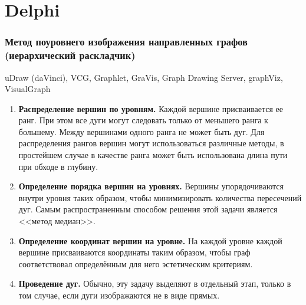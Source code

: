 \documentclass{beamer}
\begin{document}

\section{Delphi}
\begin{frame}
\frametitle{Метод поуровнего изображения направленных графов (иерархический раскладчик)}
\scriptsize{

uDraw (daVinci), VCG, Graphlet, GraVis, Graph Drawing Server, graphViz, VisualGraph

\begin{enumerate}
	\item \textbf{Распределение вершин по уровням.} Каждой вершине присваивается ее ранг. При этом все дуги могут следовать только от меньшего ранга к большему. Между вершинами одного ранга не может быть дуг. Для распределения рангов вершин могут использоваться различные методы, в простейшем случае в качестве ранга может быть использована длина пути при обходе в глубину.
	\item \textbf{Определение порядка вершин на уровнях.} Вершины упорядочиваются внутри уровня таких образом, чтобы минимизировать количества пересечений дуг. Самым распространенным способом решения этой задачи является <<метод медиан>>.
	\item \textbf{Определение координат вершин на уровне.} На каждой уровне каждой вершине присваиваются координаты таким образом, чтобы граф соответствовал определённым для него эстетическим критериям.
	\item \textbf{Проведение дуг.}	Обычно, эту задачу выделяют в отдельный этап, только в том случае, если дуги изображаются не в виде прямых.
\end{enumerate}
}
\end{frame}

\end{document}
